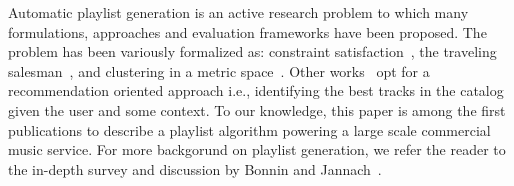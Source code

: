 






%
%

Automatic playlist generation is an active research problem to which many formulations, approaches and evaluation frameworks have been proposed. 
The problem has been variously formalized as:  constraint satisfaction~\cite{Pauws2008647}, the traveling salesman~\cite{Knees:2006}, and clustering in a metric space~\cite{Pauws:ISMIR02}. Other works~\cite{Hariri:2012, Jannach:2015,a2mf} opt for a recommendation oriented approach i.e., identifying the best tracks in the catalog given the user and some context.
To our knowledge, this paper is among the first publications to describe a playlist algorithm powering a large scale commercial music service. For more backgorund on playlist generation, we refer the reader to the in-depth survey and discussion by Bonnin and Jannach~\cite{playlist_survey}.


